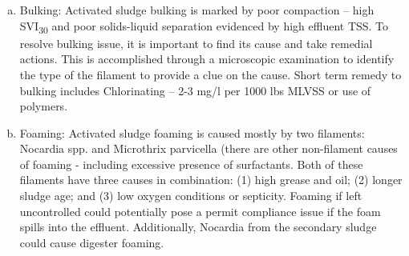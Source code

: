 \begin{enumerate}[a.]

\item Bulking:  Activated sludge bulking is marked by poor compaction – high SVI\textsubscript{30} and poor solids-liquid separation evidenced by high effluent TSS.  To resolve bulking issue, it is important to find its cause and take remedial actions.  This is accomplished through a microscopic examination to identify the type of the filament to provide a clue on the cause.  Short term remedy to bulking includes Chlorinating – 2-3 mg/l per 1000 lbs MLVSS or use of polymers.

\item Foaming:  Activated sludge foaming is caused mostly by two filaments: Nocardia spp. and Microthrix parvicella (there are other non-filament causes of foaming - including excessive presence of surfactants. Both of these filaments have three causes in combination: (1) high grease and oil; (2) longer sludge age; and (3) low oxygen conditions or septicity.  Foaming if left uncontrolled could potentially pose a permit compliance issue if the foam spills into the effluent.  Additionally, Nocardia from the secondary sludge could cause digester foaming.
\end{enumerate}


